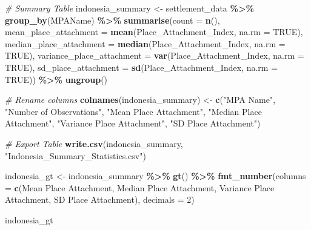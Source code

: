 \documentclass[
]{article}
\newenvironment{Shaded}{\begin{snugshade}}{\end{snugshade}}
\newcommand{\AttributeTok}[1]{\textcolor[rgb]{0.13,0.29,0.53}{#1}}
\newcommand{\CommentTok}[1]{\textcolor[rgb]{0.56,0.35,0.01}{\textit{#1}}}
\newcommand{\ConstantTok}[1]{\textcolor[rgb]{0.56,0.35,0.01}{#1}}
\newcommand{\DecValTok}[1]{\textcolor[rgb]{0.00,0.00,0.81}{#1}}
\newcommand{\FunctionTok}[1]{\textcolor[rgb]{0.13,0.29,0.53}{\textbf{#1}}}
\newcommand{\NormalTok}[1]{#1}
\newcommand{\OtherTok}[1]{\textcolor[rgb]{0.56,0.35,0.01}{#1}}
\newcommand{\SpecialCharTok}[1]{\textcolor[rgb]{0.81,0.36,0.00}{\textbf{#1}}}
\newcommand{\StringTok}[1]{\textcolor[rgb]{0.31,0.60,0.02}{#1}}
\begin{document}
\begin{Shaded}
\begin{Highlighting}[]
\CommentTok{\# Summary Table}
\NormalTok{indonesia\_summary }\OtherTok{\textless{}{-}}\NormalTok{ settlement\_data }\SpecialCharTok{\%\textgreater{}\%} 
\FunctionTok{group\_by}\NormalTok{(MPAName) }\SpecialCharTok{\%\textgreater{}\%}
  \FunctionTok{summarise}\NormalTok{(}\AttributeTok{count =} \FunctionTok{n}\NormalTok{(),}
            \AttributeTok{mean\_place\_attachment =} \FunctionTok{mean}\NormalTok{(Place\_Attachment\_Index,}
                                               \AttributeTok{na.rm =} \ConstantTok{TRUE}\NormalTok{),}
            \AttributeTok{median\_place\_attachment =} \FunctionTok{median}\NormalTok{(Place\_Attachment\_Index, }\AttributeTok{na.rm =} \ConstantTok{TRUE}\NormalTok{),}
            \AttributeTok{variance\_place\_attachment =} \FunctionTok{var}\NormalTok{(Place\_Attachment\_Index, }\AttributeTok{na.rm =} \ConstantTok{TRUE}\NormalTok{),}
            \AttributeTok{sd\_place\_attachment =} \FunctionTok{sd}\NormalTok{(Place\_Attachment\_Index, }\AttributeTok{na.rm =} \ConstantTok{TRUE}\NormalTok{)) }\SpecialCharTok{\%\textgreater{}\%}
  \FunctionTok{ungroup}\NormalTok{()}

\CommentTok{\# Rename columns}
\FunctionTok{colnames}\NormalTok{(indonesia\_summary) }\OtherTok{\textless{}{-}} \FunctionTok{c}\NormalTok{(}\StringTok{"MPA Name"}\NormalTok{, }\StringTok{"Number of Observations"}\NormalTok{,}
                                 \StringTok{"Mean Place Attachment"}\NormalTok{,}
                                 \StringTok{"Median Place Attachment"}\NormalTok{,}
                                 \StringTok{"Variance Place Attachment"}\NormalTok{,}
                                 \StringTok{"SD Place Attachment"}\NormalTok{)}

\CommentTok{\# Export Table}
\FunctionTok{write.csv}\NormalTok{(indonesia\_summary, }\StringTok{"Indonesia\_Summary\_Statistics.csv"}\NormalTok{)}

\NormalTok{indonesia\_gt }\OtherTok{\textless{}{-}}\NormalTok{ indonesia\_summary }\SpecialCharTok{\%\textgreater{}\%} \FunctionTok{gt}\NormalTok{() }\SpecialCharTok{\%\textgreater{}\%} 
  \FunctionTok{fmt\_number}\NormalTok{(}\AttributeTok{columns =} \FunctionTok{c}\NormalTok{(}\StringTok{\textasciigrave{}}\AttributeTok{Mean Place Attachment}\StringTok{\textasciigrave{}}\NormalTok{,}
                         \StringTok{\textasciigrave{}}\AttributeTok{Median Place Attachment}\StringTok{\textasciigrave{}}\NormalTok{,}
                         \StringTok{\textasciigrave{}}\AttributeTok{Variance Place Attachment}\StringTok{\textasciigrave{}}\NormalTok{,}
                         \StringTok{\textasciigrave{}}\AttributeTok{SD Place Attachment}\StringTok{\textasciigrave{}}\NormalTok{),}
             \AttributeTok{decimals =} \DecValTok{2}\NormalTok{)}

\NormalTok{indonesia\_gt}
\end{Highlighting}
\end{Shaded}
\end{document}
